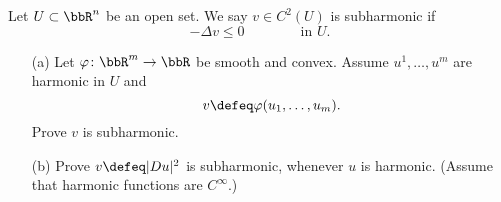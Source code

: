 \begin{problem}
  Let \(U\subset\bbR^n\) be an open set. We say \(v \in C^2(U)\) is
  subharmonic if
  \[
    -\Delta v\leq 0\qquad\qquad\text{in \(U\).}
  \]
  \begin{itemize}
  \item[(a)] Let \(\varphi\colon\bbR^m\to\bbR\) be smooth and
    convex. Assume \(u^1,\dotsc,u^m\) are harmonic in \(U\) and
    \[
      v\defeq\varphi(u_1,\dotsc,u_m).
    \]
    Prove \(v\) is subharmonic.

    \noindent
    [\emph{Hint:} Convexity for a smooth function \(\varphi(z)\) is
    equivalent to \(\sum_{j,k=1}^m\varphi_{z_j,z_k}(z)\xi_j\xi_k\geq 0\)
    for any \(\xi\in\bbR^m\).]
  \item[(b)] Prove \(v\defeq|Du|^2\) is subharmonic, whenever \(u\) is
    harmonic. (Assume that harmonic functions are \(C^\infty\).)
  \end{itemize}
\end{problem}
